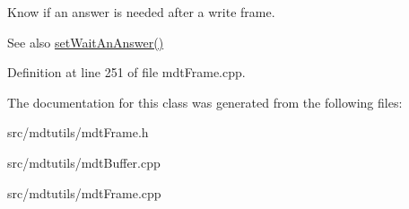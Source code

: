 Know if an answer is needed after a write frame. 

\begin{DoxySeeAlso}{See also}
\hyperlink{classmdt_frame_a3b9a331858df9061879592fab1b346f5}{setWaitAnAnswer()} 
\end{DoxySeeAlso}


Definition at line 251 of file mdtFrame.cpp.



The documentation for this class was generated from the following files:\begin{DoxyCompactItemize}
\item 
src/mdtutils/mdtFrame.h\item 
src/mdtutils/mdtBuffer.cpp\item 
src/mdtutils/mdtFrame.cpp\end{DoxyCompactItemize}
